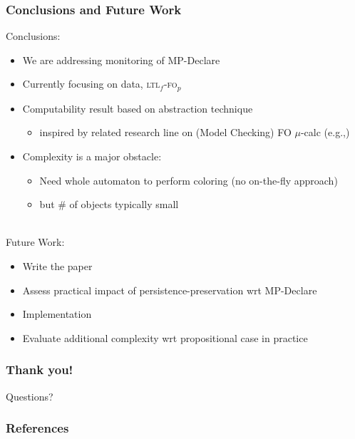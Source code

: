 \documentclass[xcolor=dvipsnames,aspectratio=169]{beamer}
\newcommand{\ltlf}{\textsc{ltl}$_f$\xspace}
\newcommand{\ltlffop}{\ltlf-\textsc{fo}$_p$\xspace}
\begin{document}
\begin{frame}
\frametitle{Conclusions and Future Work}

Conclusions:
\begin{itemize}
	\item We are addressing monitoring of MP-Declare
	\item Currently focusing on data, \ltlffop
	\item Computability result based on abstraction technique
		\begin{itemize}
			\item inspired by related research line on (Model Checking) FO $\mu$-calc (e.g.,\cite{AIJ16,IC18})
		\end{itemize}
	\item Complexity is a major obstacle: 
		\begin{itemize}
			\item Need whole automaton to perform coloring (no on-the-fly approach)
			\item but \# of objects typically small
		\end{itemize}
\end{itemize}

~\\

Future Work:
	\begin{itemize}
		\item Write the paper \smiley
		\item Assess practical impact of persistence-preservation wrt MP-Declare
		\item Implementation
		\item Evaluate additional complexity wrt propositional case in practice
	\end{itemize}




\end{frame}


\begin{frame}
\frametitle{Thank you!}
\begin{center}
\begin{huge}
Questions?
\end{huge}
\end{center}
\end{frame}


\begin{frame}[allowframebreaks]
\frametitle{References}
\small{


}
\end{frame}

\end{document}
